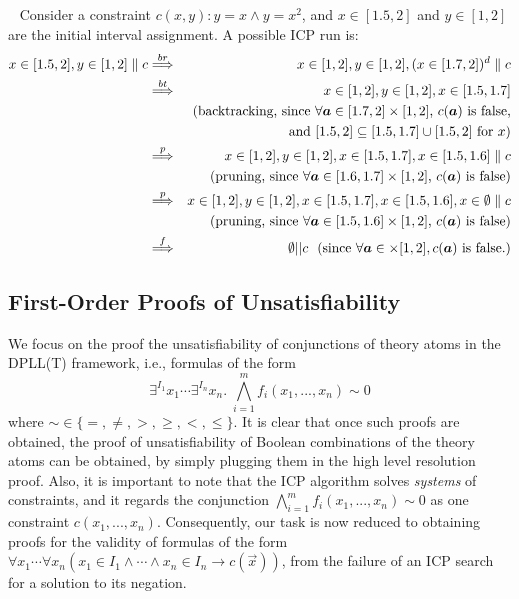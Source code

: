 \documentclass[envcountsect]{llncs}
\begin{document}
\begin{example}~\label{icp-example}
Consider a constraint $c(x,y) : y=x \wedge y = x^2$, and $x\in [1.5,2]$ and
$y\in [1,2]$ are the initial interval assignment. A possible ICP run is:
\begin{eqnarray*}
x\in [1.5,2], y\in [1,2]\parallel c &\stackrel{br}{\Longrightarrow}& x\in [1,2],
y\in [1,2], (x\in [1.7, 2])^d\parallel c\\
&\stackrel{bt}{\Longrightarrow}& x\in [1,2], y\in [1,2], x\in [1.5, 1.7]\\
& & \mbox{  (backtracking, since $\forall\vec a\in [1.7,2]\times [1,2]$,
$c(\vec a)$ is false,}\\
& & \ \ \mbox{and $[1.5,2]\subseteq[1.5,1.7]\cup [1.5, 2]$ for
$x$)}\\
&\stackrel{p}{\Longrightarrow}& x\in [1,2], y\in [1,2], x\in [1.5, 1.7], x\in
[1.5, 1.6]\parallel c\\
& & \mbox{  (pruning, since $\forall \vec a\in[1.6,1.7]\times [1, 2]$, $c(\vec
a)$ is false)}\\
&\stackrel{p}{\Longrightarrow}& x\in [1,2], y\in [1,2], x\in [1.5, 1.7],
x\in [1.5, 1.6], x\in \emptyset\parallel c\\
& & \mbox{  (pruning, since $\forall \vec a\in[1.5,1.6]\times [1, 2]$, $c(\vec
a)$
is false)}\\
&\stackrel{f}{\Longrightarrow}& \emptyset||c\ \mbox{ (since
$\forall \vec a\in \empty\times [1, 2], c(\vec a)$ is false.)}
\end{eqnarray*}
\end{example}




\subsection{First-Order Proofs of Unsatisfiability}

We focus on the proof the unsatisfiability of conjunctions of theory
atoms in the DPLL(T) framework, i.e., formulas of the form
$$\exists^{I_1} x_1\cdots \exists^{I_n} x_n.\; \bigwedge_{i=1}^m
f_i(x_1,...,x_n)\sim 0$$
where $\sim \in \{=,\neq, >, \geq, <, \leq\}$. It is clear that once such
proofs are obtained, the proof of unsatisfiability of Boolean combinations of
the theory atoms can be obtained, by simply plugging them in the high level
resolution proof. Also, it is important to note that the ICP algorithm solves
{\em systems} of constraints, and it regards the conjunction $\bigwedge_{i=1}^m
f_i(x_1,...,x_n)\sim 0$ as one constraint $c(x_1,...,x_n)$. Consequently, our
task is now reduced to obtaining proofs for the validity of formulas of the form
$\forall x_1 \cdots \forall x_n (x_1\in I_1\wedge \cdots \wedge x_n\in I_n
\rightarrow c(\vec x))$, from the failure of an ICP
search for a solution to its negation.
\end{document}
